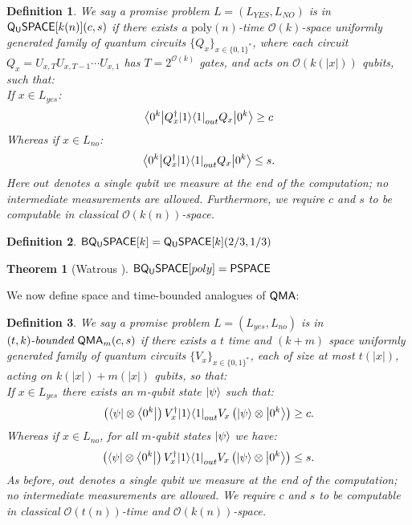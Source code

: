 \documentclass[11pt]{article}
\newtheorem{theorem}{Theorem}
\newtheorem{definition}{Definition}
\theoremstyle{definition}
\theoremstyle{remark}
\newcommand\QMA{{\sf{QMA}}}
\newcommand\QSPACE{{\sf{Q_{U}SPACE}}}
\newcommand\PQSPACE{{\sf{PQ_{U}SPACE}}}
\newcommand\BQSPACE{{\sf{BQ_{U}SPACE}}}
\newcommand\PSPACE{{\sf{PSPACE}}}
\newcommand\bddQMA[5]{{\left(#1,#2\right)}\textit{-bounded }\QMA_{#3}(#4,#5)}
\newcommand\bigoh{\mathcal{O}}
\newcommand{\poly}{\textrm{poly}}
\begin{document}
\begin{definition}
We say a promise problem $L=(L_{YES},L_{NO})$ is in $\QSPACE[k(n)](c,s)$ if there exists a $\poly(n)$-time $\mathcal{O}(k)$-space uniformly generated family of quantum circuits $\{Q_x\}_{x\in\{0,1\}^*}$, where each circuit $Q_x=U_{x,T}U_{x,T-1}\cdots U_{x,1}$ has $T=2^{\mathcal{O}(k)}$ gates, and acts on $\mathcal{O}(k(|x|))$ qubits, such that:\\
 If $x \in L_{yes}$:
\begin{equation}
{\left\langle{0^k}\right\vert} Q^\dagger_x {\left\vert{1}\right\rangle}{\left\langle{1}\right\vert}_{out} Q_x {\left\vert{0^k}\right\rangle} \ge c
\end{equation}
Whereas if $x \in L_{no}$:
\begin{equation}
{\left\langle{0^k}\right\vert} Q^\dagger_x {\left\vert{1}\right\rangle}{\left\langle{1}\right\vert}_{out} Q_x {\left\vert{0^k}\right\rangle} \le s.
\end{equation}
Here $out$ denotes a single qubit we measure at the end of the computation; no intermediate measurements are allowed.  
Furthermore, we require $c$ and $s$ to be computable in classical $\bigoh(k(n))$-space.
\end{definition}

\begin{definition} $\BQSPACE[k]=\QSPACE[k](2/3,1/3)$\end{definition}
\begin{theorem}[Watrous \cite{Watrous99}]\label{thm:pqpspace} $\BQSPACE[poly]=\PSPACE$
\end{theorem}

We now define space and time-bounded analogues of $\QMA$:
\begin{definition}We say a promise problem $L=(L_{yes},L_{no})$ is in $\bddQMA{t}{k}{m}{c}{s}$ if there exists a $t$ time and $(k+m)$ space uniformly generated family of quantum circuits $\{ V_x\}_{x\in\{0,1\}^*}$, each of size at most $t(|x|)$, acting on $k(|x|)+m(|x|)$ qubits, so that:\\

If $x \in L_{yes}$ there exists an $m$-qubit state ${\left\vert{\psi}\right\rangle}$ such that:
\begin{equation}
\left({\left\langle{\psi}\right\vert}\otimes {\left\langle{0^k}\right\vert}\right) V^\dagger_x {\left\vert{1}\right\rangle}{\left\langle{1}\right\vert}_{out} V_x \left({\left\vert{\psi}\right\rangle}\otimes {\left\vert{0^k}\right\rangle}\right) \ge c.
\end{equation}
Whereas if $x \in L_{no}$, for all $m$-qubit states ${\left\vert{\psi}\right\rangle}$ we have:
\begin{equation}
\left({\left\langle{\psi}\right\vert}\otimes {\left\langle{0^k}\right\vert}\right) V^\dagger_x {\left\vert{1}\right\rangle}{\left\langle{1}\right\vert}_{out} V_x \left({\left\vert{\psi}\right\rangle}\otimes {\left\vert{0^k}\right\rangle}\right) \le s.
\end{equation}
As before, $out$ denotes a single qubit we measure at the end of the computation; no intermediate measurements are allowed.  
We require $c$ and $s$ to be computable in classical $\bigoh(t(n))$-time and $\bigoh(k(n))$-space.
  \end{definition}
\end{document}
